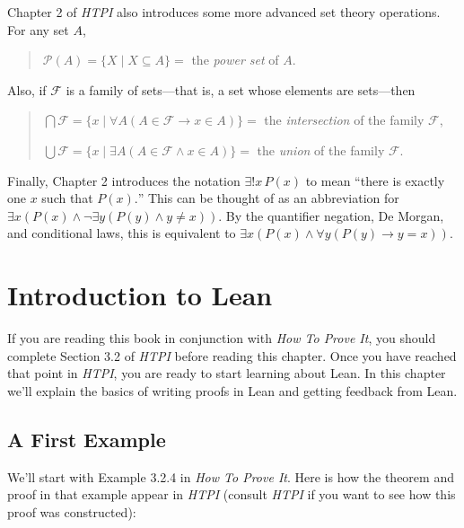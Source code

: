 \documentclass[
  letterpaper,
  DIV=11,
  numbers=noendperiod]{scrreprt}
\theoremstyle{remark}
\begin{document}
Chapter 2 of \emph{HTPI} also introduces some more advanced set theory
operations. For any set \(A\),

\begin{quote}
\(\mathscr{P}(A) = \{X \mid X \subseteq A\} = {}\) the \emph{power set}
of \(A\).

\end{quote}

Also, if \(\mathcal{F}\) is a family of sets---that is, a set whose
elements are sets---then

\begin{quote}
\(\bigcap \mathcal{F} = \{x \mid \forall A(A \in \mathcal{F} \to x \in A)\} = {}\)
the \emph{intersection} of the family \(\mathcal{F}\),

\(\bigcup \mathcal{F} = \{x \mid \exists A(A \in \mathcal{F} \wedge x \in A)\} = {}\)
the \emph{union} of the family \(\mathcal{F}\).

\end{quote}

Finally, Chapter 2 introduces the notation \(\exists ! x\,P(x)\) to mean
``there is exactly one \(x\) such that \(P(x).\)'' This can be thought
of as an abbreviation for
\(\exists x(P(x) \wedge \neg\exists y(P(y) \wedge y \ne x))\). By the
quantifier negation, De Morgan, and conditional laws, this is equivalent
to \(\exists x(P(x) \wedge \forall y(P(y) \to y = x))\).


\hypertarget{introduction-to-lean}{%
\chapter*{Introduction to Lean}\label{introduction-to-lean}}

If you are reading this book in conjunction with \emph{How To Prove It},
you should complete Section 3.2 of \emph{HTPI} before reading this
chapter. Once you have reached that point in \emph{HTPI}, you are ready
to start learning about Lean. In this chapter we'll explain the basics
of writing proofs in Lean and getting feedback from Lean.

\hypertarget{a-first-example}{%
\section*{A First Example}\label{a-first-example}}

We'll start with Example 3.2.4 in \emph{How To Prove It}. Here is how
the theorem and proof in that example appear in \emph{HTPI} (consult
\emph{HTPI} if you want to see how this proof was constructed):
\end{document}
